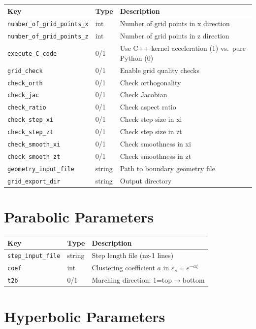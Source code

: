 \documentclass[11pt,a4paper]{report}
\begin{document}
\begin{longtable}{p{5.5cm} p{2cm} p{7cm}}
\toprule
\textbf{Key} & \textbf{Type} & \textbf{Description} \\
\midrule
\texttt{number\_of\_grid\_points\_x} & int & Number of grid points in x direction \\
\texttt{number\_of\_grid\_points\_z} & int & Number of grid points in z direction \\
\texttt{execute\_C\_code} & 0/1 & Use C++ kernel acceleration (1) vs.\ pure Python (0) \\
\texttt{grid\_check} & 0/1 & Enable grid quality checks \\
\texttt{check\_orth} & 0/1 & Check orthogonality \\
\texttt{check\_jac} & 0/1 & Check Jacobian \\
\texttt{check\_ratio} & 0/1 & Check aspect ratio \\
\texttt{check\_step\_xi} & 0/1 & Check step size in xi \\
\texttt{check\_step\_zt} & 0/1 & Check step size in zt \\
\texttt{check\_smooth\_xi} & 0/1 & Check smoothness in xi \\
\texttt{check\_smooth\_zt} & 0/1 & Check smoothness in zt \\
\texttt{geometry\_input\_file} & string & Path to boundary geometry file \\
\texttt{grid\_export\_dir} & string & Output directory \\
\bottomrule
\end{longtable}

\section{Parabolic Parameters}

\begin{longtable}{p{5.5cm} p{2cm} p{7cm}}
\toprule
\textbf{Key} & \textbf{Type} & \textbf{Description} \\
\midrule
\texttt{step\_input\_file} & string & Step length file (nz-1 lines) \\
\texttt{coef} & int & Clustering coefficient $a$ in $\varepsilon_s = e^{-a\zeta}$ \\
\texttt{t2b} & 0/1 & Marching direction: 1=top$\to$bottom \\
\bottomrule
\end{longtable}

\section{Hyperbolic Parameters}
\end{document}
